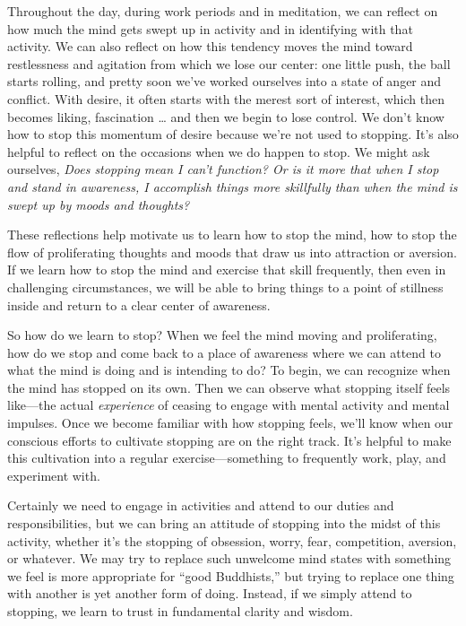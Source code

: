 Throughout the day, during work periods and in meditation, we can 
reflect on how much the mind gets swept up in activity and in 
identifying with that activity. We can also reflect on how this 
tendency moves the mind toward restlessness and agitation from which we 
lose our center: one little push, the ball starts rolling, and pretty 
soon we've worked ourselves into a state of anger and conflict. With 
desire, it often starts with the merest sort of interest, which then 
becomes liking, fascination \ldots{} and then we begin to lose control. 
We don't know how to stop this momentum of desire because we're not 
used to stopping. It's also helpful to reflect on the occasions when we 
do happen to stop. We might ask ourselves, \emph{Does stopping mean I 
can't function? Or is it more that when I stop and stand in awareness, 
I accomplish things more skillfully than when the mind is swept up by 
moods and thoughts?}

These reflections help motivate us to learn how to stop the mind, how 
to stop the flow of proliferating thoughts and moods that draw us into 
attraction or aversion. If we learn how to stop the mind and exercise 
that skill frequently, then even in challenging circumstances, we will 
be able to bring things to a point of stillness inside and return to a 
clear center of awareness.

So how do we learn to stop? When we feel the mind moving and 
proliferating, how do we stop and come back to a place of awareness 
where we can attend to what the mind is doing and is intending to do? 
To begin, we can recognize when the mind has stopped on its own. Then 
we can observe what stopping itself feels like---the actual 
\emph{experience} of ceasing to engage with mental activity and mental 
impulses. Once we become familiar with how stopping feels, we'll know 
when our conscious efforts to cultivate stopping are on the right 
track. It's helpful to make this cultivation into a regular 
exercise---something to frequently work, play, and experiment with.

Certainly we need to engage in activities and attend to our duties and 
responsibilities, but we can bring an attitude of stopping into the 
midst of this activity, whether it's the stopping of obsession, worry, 
fear, competition, aversion, or whatever. We may try to replace such 
unwelcome mind states with something we feel is more appropriate for 
``good Buddhists,'' but trying to replace one thing with another is yet 
another form of doing. Instead, if we simply attend to stopping, we 
learn to trust in fundamental clarity and wisdom.

